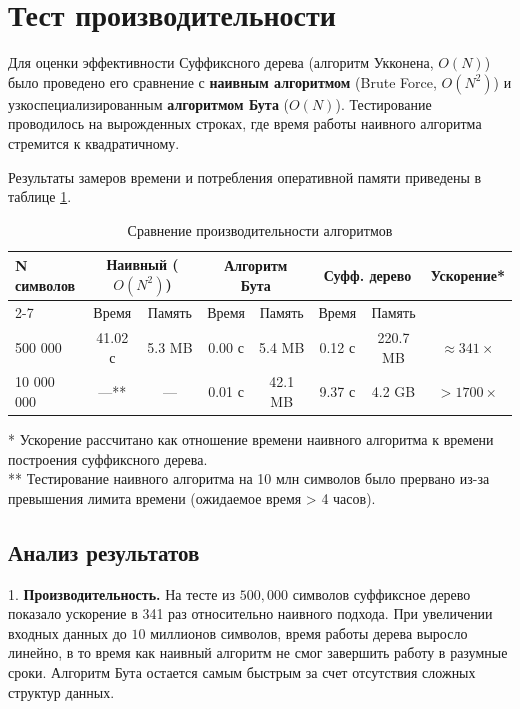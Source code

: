 \section{Тест производительности}

Для оценки эффективности Суффиксного дерева (алгоритм Укконена, $O(N)$) было проведено его сравнение с \textbf{наивным алгоритмом} (Brute Force, $O(N^2)$) и узкоспециализированным \textbf{алгоритмом Бута} ($O(N)$). Тестирование проводилось на вырожденных строках, где время работы наивного алгоритма стремится к квадратичному.

Результаты замеров времени и потребления оперативной памяти приведены в таблице \ref{tab:benchmark}.

\begin{table}[h!]
\centering
\caption{Сравнение производительности алгоритмов}
\label{tab:benchmark}
\begin{small}
\begin{tabular}{|l|c|c|c|c|c|c|c|}
\hline
\multirow{2}{*}{\textbf{N символов}} & \multicolumn{2}{c|}{\textbf{Наивный ($O(N^2)$)}} & \multicolumn{2}{c|}{\textbf{Алгоритм Бута}} & \multicolumn{2}{c|}{\textbf{Суфф. дерево}} & \multirow{2}{*}{\textbf{Ускорение*}} \\ \cline{2-7}
 & Время & Память & Время & Память & Время & Память & \\ \hline
500 000 & 41.02 с & 5.3 MB & 0.00 с & 5.4 MB & 0.12 с & 220.7 MB & $\approx 341 \times$ \\ \hline
10 000 000 & ---** & --- & 0.01 с & 42.1 MB & 9.37 с & 4.2 GB & $> 1700 \times$ \\ \hline
\end{tabular}
\end{small}

\smallskip
\begin{flushleft}
\footnotesize
* Ускорение рассчитано как отношение времени наивного алгоритма к времени построения суффиксного дерева. \\
** Тестирование наивного алгоритма на 10 млн символов было прервано из-за превышения лимита времени (ожидаемое время > 4 часов).
\end{flushleft}
\end{table}

\subsection*{Анализ результатов}

1. \textbf{Производительность.} На тесте из $500,000$ символов суффиксное дерево показало ускорение в 341 раз относительно наивного подхода. При увеличении входных данных до $10$ миллионов символов, время работы дерева выросло линейно, в то время как наивный алгоритм не смог завершить работу в разумные сроки. Алгоритм Бута остается самым быстрым за счет отсутствия сложных структур данных.

